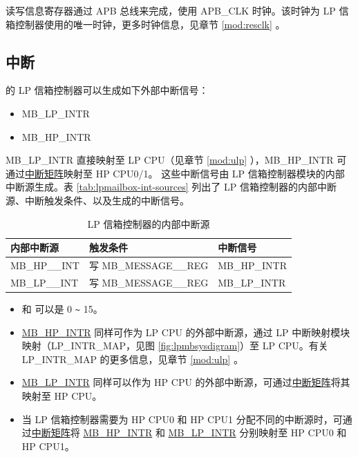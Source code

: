 \documentclass[main\_\_CN.tex]{subfiles}
\begin{document}
读写信息寄存器通过 APB 总线来完成，使用 APB\_CLK 时钟。该时钟为 LP 信箱控制器使用的唯一时钟，更多时钟信息，见章节 \ref{mod:resclk} \textit{}。

\subsection{中断}
\label{sec:lpmailbox-interrupt}

\chipname{} 的 LP 信箱控制器可以生成如下外部中断信号：
    \begin{itemize}
        \item MB\_LP\_INTR
        \item MB\_HP\_INTR
    \end{itemize}
MB\_LP\_INTR 直接映射至 LP CPU（见章节 \ref{mod:ulp} \textit{\textcolor{red}{}}），MB\_HP\_INTR 可通过\hyperref[mod:intmtrx]{中断矩阵}映射至 HP CPU0/1。
这些中断信号由 LP 信箱控制器模块的内部中断源生成。表 \ref{tab:lpmailbox-int-sources} 列出了 LP 信箱控制器的内部中断源、中断触发条件、以及生成的中断信号。
\begin{longtable}{ | L{5cm} | L{6.5cm} | L{4cm} | }
\caption{LP 信箱控制器的内部中断源} \label{tab:lpmailbox-int-sources}
\\ \hline
{}
\textbf{内部中断源} & \textbf{触发条件}  &  \textbf{中断信号}\\ \hline
\label{int:MBHPmINT} MB\_HP\_\_INT &  写 MB\_MESSAGE\_\_REG &  MB\_HP\_INTR  \\ \hline
\label{int:MBLPnINT} MB\_LP\_\_INT &  写 MB\_MESSAGE\_\_REG &  MB\_LP\_INTR  \\ \hline
\end{longtable}
\begin{tiplisting}
\vspace{-2em}
\begin{itemize}
    \item {} 和  可以是 0 \verb+~+ 15。
    \item\hyperref[tab:lpmailbox-int-sources]{MB\_HP\_INTR} 同样可作为 LP CPU 的外部中断源，通过 LP 中断映射模块映射（LP\_INTR\_MAP，见图 \ref{fig:lpmbsysdigram}）至 LP CPU。有关 LP\_INTR\_MAP 的更多信息，见章节 \ref{mod:ulp} \textit{}。
    \item\hyperref[tab:lpmailbox-int-sources]{MB\_LP\_INTR} 同样可以作为 HP CPU 的外部中断源，可通过\hyperref[mod:intmtrx]{中断矩阵}将其映射至 HP CPU。
    \item 当 LP 信箱控制器需要为 HP CPU0 和 HP CPU1 分配不同的中断源时，可通过\hyperref[mod:intmtrx]{中断矩阵}将 \hyperref[tab:lpmailbox-int-sources]{MB\_HP\_INTR} 和 \hyperref[tab:lpmailbox-int-sources]{MB\_LP\_INTR} 分别映射至 HP CPU0 和 HP CPU1。
    \end{itemize}
\end{tiplisting}
\end{document}
